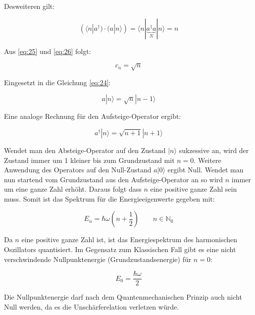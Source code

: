 Desweiteren gilt:

\begin{equation}
  \label{eq:26}
   (\langle n| a^\dagger )\cdot(a|n\rangle ) = \langle n| \underbrace{a^\dagger a}_{N} | n\rangle  = n
\end{equation}

Aus  \eqref{eq:25} und \eqref{eq:26} folgt:

\begin{equation}
  \label{eq:27}
  c_n = \sqrt{n}
\end{equation}

Eingesetzt in die Gleichung \eqref{eq:24}:

\begin{equation}
  \label{eq:28}
   \boxed{ a|n\rangle = \sqrt{n}|n-1\rangle }
\end{equation}

Eine analoge Rechnung für den Aufsteige-Operator ergibt:

\begin{equation}
  \label{eq:29}
  \boxed{ a^\dagger|n\rangle = \sqrt{n+1}|n+1\rangle }
\end{equation}

Wendet man den Absteige-Operator auf den Zustand \(|n\rangle \) sukzessive an, wird der Zustand immer um 1 kleiner bis zum Grundzustand mit \(n=0\). Weitere Anwendung des Operators auf den Null-Zustand \(a|0\rangle \) ergibt Null. Wendet man nun startend vom Grundzustand aus den Aufsteige-Operator an so wird \(n\) immer um eine ganze Zahl erhöht. Daraus folgt dass \(n\) eine positive ganze Zahl sein muss. Somit ist das Spektrum für die Energieeigenwerte gegeben mit:

\begin{equation}
  \label{eq:30}
  \boxed{E_n = \hbar\omega\left(n + \frac{1}{2}\right) \qquad n \in \mathbb N_0}
\end{equation}

Da \(n\) eine positive ganze Zahl ist, ist das Energiespektrum des harmonischen Oszillators quantisiert. Im Gegensatz zum Klassischen Fall gibt es eine nicht verschwindende Nullpunktenergie (Grundzustandsenergie) für \(n=0\):

\begin{equation}
  \label{eq:31}
  E_0 = \frac{\hbar\omega }{2}
\end{equation}

Die Nullpunktenergie darf nach dem Quantenmechanischen Prinzip auch nicht Null werden, da es die Unschärferelation verletzen würde.


